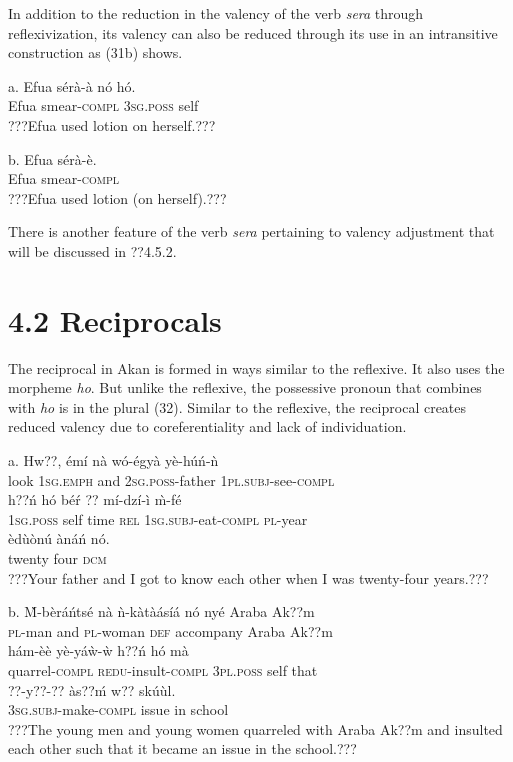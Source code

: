 \documentclass[output=paper]{langsci/langscibook}
\begin{document}
In addition to the reduction in the valency of the verb \emph{sera} through reflexivization, its valency can also be reduced through its use in an intransitive construction as (31b) shows.

\ea
\gll a.  Efua  sérà-à    nó    hó.\\
       Efua  smear-\textsc{compl}  \textsc{3sg.poss}  self\\
\glt   ???Efua used lotion on herself.???
\z

\ea
\gll b.  Efua  sérà-è.\\
       Efua  smear-\textsc{compl}\\
\glt   ???Efua used lotion (on herself).???
\z

There is another feature of the verb \emph{sera} pertaining to valency adjustment that will be discussed in ??4.5.2.

\section{4.2  Reciprocals}

The reciprocal in Akan is formed in ways similar to the reflexive. It also uses the morpheme \emph{ho}. But unlike the reflexive, the possessive pronoun that combines with \emph{ho} is in the plural (32). Similar to the reflexive, the reciprocal creates reduced valency due to coreferentiality and lack of individuation.

\ea
\gll a.  Hw??,  émí     nà   wó-égyà     yè-húń-ǹ       \\
       look  \textsc{1sg.emph}  and  \textsc{2sg.poss}{}-father  \textsc{1pl.subj}{}-see-\textsc{compl}  \\
\gll   h??ń    hó   bé\'{r}   ??  mí-dzí-ì     \`{m}-fé  \\
       \textsc{1sg.poss}  self  time  \textsc{rel}  \textsc{1sg.subj}{}-eat-\textsc{compl}  \textsc{pl}{}-year\\
\gll   èd\`{u}ònú   ànáń     nó.     \\
       twenty    four    \textsc{dcm}\\
\glt ???Your father and I got to know each other when I was twenty-four years.??? \citep[9]{Martin1936}
\z

\ea
\gll  b.  \`{M}-bèráńtsé  nà  ǹ-kàtàásíá  nó   nyé     Araba Ak??m  \\
       \textsc{pl}{}-man    and  \textsc{pl}{}-woman  \textsc{def}  accompany  Araba Ak??m\\
\gll   hám-èè      yè-yáẁ-ẁ    h??ń    hó  mà\\
       quarrel-\textsc{compl}    \textsc{redu}{}-insult-\textsc{compl}  \textsc{3pl.poss}  self  that\\
\gll   ??{}-y??-??        às??ḿ  w??  skú\`{u}l.\\
       \textsc{3sg.subj}{}-make-\textsc{compl}  issue  in  school\\
\glt ???The young men and young women quarreled with Araba Ak??m and insulted each other such that it became an issue in the school.??? \citep[21]{Martin1936}  
\z
\end{document}
